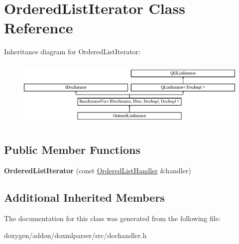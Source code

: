 \hypertarget{class_ordered_list_iterator}{}\section{Ordered\+List\+Iterator Class Reference}
\label{class_ordered_list_iterator}
Inheritance diagram for Ordered\+List\+Iterator\+:\begin{figure}[H]
\begin{center}
\leavevmode
\includegraphics[height=3.294118cm]{class_ordered_list_iterator}
\end{center}
\end{figure}
\subsection*{Public Member Functions}
\begin{DoxyCompactItemize}
\item 
\mbox{\label{class_ordered_list_iterator_a1b4dd11db6e073569988901cdae21c6a}} 
{\bfseries Ordered\+List\+Iterator} (const \mbox{\hyperlink{class_ordered_list_handler}{Ordered\+List\+Handler}} \&handler)
\end{DoxyCompactItemize}
\subsection*{Additional Inherited Members}


The documentation for this class was generated from the following file\+:\begin{DoxyCompactItemize}
\item 
doxygen/addon/doxmlparser/src/dochandler.\+h\end{DoxyCompactItemize}
